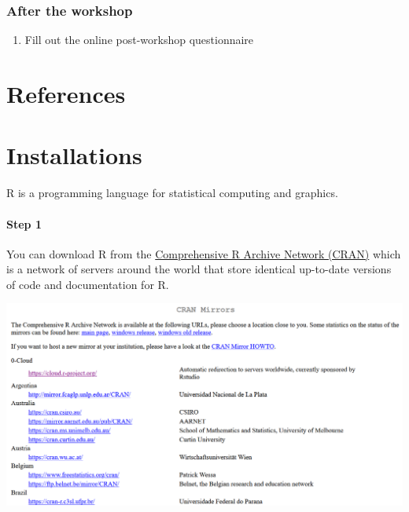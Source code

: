 \documentclass[
  letterpaper,
  DIV=11,
  numbers=noendperiod]{scrreprt}
\providecommand{\tightlist}{%
  \setlength{\itemsep}{0pt}\setlength{\parskip}{0pt}}\usepackage{longtable,booktabs,array}
\newlength{\cslhangindent}
\newlength{\cslentryspacingunit} %
\newenvironment{CSLReferences}[2] %
 {%
  \setlength{\parindent}{0pt}
  \ifodd #1
  \let\oldpar\par
  \def\par{\hangindent=\cslhangindent\oldpar}
  \fi
  \setlength{\parskip}{#2\cslentryspacingunit}
 }%
 {}
\begin{document}
\hypertarget{after-the-workshop}{%
\subsection{After the workshop}\label{after-the-workshop}}

\begin{enumerate}
\def\labelenumi{\arabic{enumi}.}
\tightlist
\item
  Fill out the online post-workshop questionnaire
\end{enumerate}


\hypertarget{references}{%
\chapter*{References}\label{references}}

\hypertarget{refs}{}
\begin{CSLReferences}{0}{0}
\end{CSLReferences}

\appendix
{}

\hypertarget{installations}{%
\chapter{Installations}\label{installations}}

R is a programming language for statistical computing and graphics.

\hypertarget{step-1}{%
\subsubsection{Step 1}\label{step-1}}

You can download R from the
\href{https://cran.r-project.org/mirrors.html}{Comprehensive R Archive
Network (CRAN)} which is a network of servers around the world that
store identical up-to-date versions of code and documentation for R.

\includegraphics{./images/paste-13103C13.png}
\end{document}

